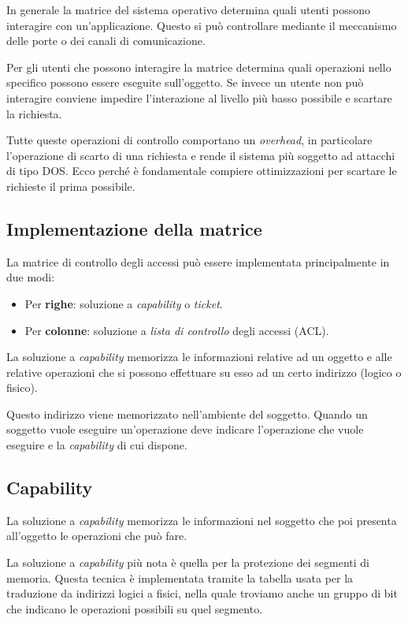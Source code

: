 In generale la matrice del sistema operativo determina quali utenti possono interagire con un'applicazione. Questo si
può controllare mediante il meccanismo delle porte o dei canali di comunicazione.

Per gli utenti che possono interagire la matrice determina quali operazioni nello specifico possono essere eseguite
sull'oggetto. Se invece un utente non può interagire conviene impedire l'interazione al livello più basso possibile
e scartare la richiesta.

Tutte queste operazioni di controllo comportano un \emph{overhead}, in particolare l'operazione di scarto di una
richiesta e rende il sistema più soggetto ad attacchi di tipo DOS. Ecco perché è fondamentale compiere ottimizzazioni
per scartare le richieste il prima possibile.

\subsection{Implementazione della matrice}
La matrice di controllo degli accessi può essere implementata principalmente in due modi:
\begin{itemize}
	\item Per \textbf{righe}: soluzione a \emph{capability} o \emph{ticket}.
	\item Per \textbf{colonne}: soluzione a \emph{lista di controllo} degli accessi (ACL).
\end{itemize}
La soluzione a \emph{capability} memorizza le informazioni relative ad un oggetto e alle relative operazioni che si
possono effettuare su esso ad un certo indirizzo (logico o fisico).

Questo indirizzo viene memorizzato nell'ambiente del soggetto. Quando un soggetto vuole eseguire un'operazione deve
indicare l'operazione che vuole eseguire e la \emph{capability} di cui dispone.

\subsection{Capability}
La soluzione a \emph{capability} memorizza le informazioni nel soggetto che poi presenta all'oggetto le operazioni
che può fare.

La soluzione a \emph{capability} più nota è quella per la protezione dei segmenti di memoria. Questa tecnica è
implementata tramite la tabella usata per la traduzione da indirizzi logici a fisici, nella quale troviamo anche un
gruppo di bit che indicano le operazioni possibili su quel segmento.

